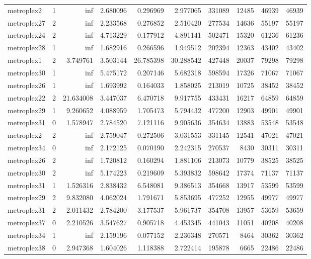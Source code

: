 \begin{longtable}{|l|r|r|r|r|r|r|r|r|r|}
metroplex2 & 1 & inf & 2.680096 & 0.296969 & 2.977065 & 331089 & 12485 & 46939 & 46939 \\
metroplex27 & 2 & inf & 2.233568 & 0.276852 & 2.510420 & 277534 & 14636 & 55197 & 55197 \\
metroplex24 & 2 & inf & 4.713229 & 0.177912 & 4.891141 & 502471 & 15320 & 61236 & 61236 \\
metroplex28 & 1 & inf & 1.682916 & 0.266596 & 1.949512 & 202394 & 12363 & 43402 & 43402 \\
metroplex1 & 2 & 3.749761 & 3.503144 & 26.785398 & 30.288542 & 427448 & 20037 & 79298 & 79298 \\
metroplex30 & 1 & inf & 5.475172 & 0.207146 & 5.682318 & 598594 & 17326 & 71067 & 71067 \\
metroplex26 & 1 & inf & 1.693992 & 0.164033 & 1.858025 & 213019 & 10725 & 38452 & 38452 \\
metroplex22 & 2 & 21.634008 & 3.447037 & 6.470718 & 9.917755 & 433431 & 16217 & 64859 & 64859 \\
metroplex29 & 1 & 9.260652 & 4.088959 & 1.705473 & 5.794432 & 477200 & 12903 & 49901 & 49901 \\
metroplex31 & 0 & 1.578947 & 2.784520 & 7.121116 & 9.905636 & 354634 & 13883 & 53548 & 53548 \\
metroplex2 & 2 & inf & 2.759047 & 0.272506 & 3.031553 & 331145 & 12541 & 47021 & 47021 \\
metroplex34 & 0 & inf & 2.172125 & 0.070190 & 2.242315 & 270537 & 8430 & 30311 & 30311 \\
metroplex26 & 2 & inf & 1.720812 & 0.160294 & 1.881106 & 213073 & 10779 & 38525 & 38525 \\
metroplex30 & 2 & inf & 5.174223 & 0.219609 & 5.393832 & 598642 & 17374 & 71137 & 71137 \\
metroplex31 & 1 & 1.526316 & 2.838432 & 6.548081 & 9.386513 & 354668 & 13917 & 53599 & 53599 \\
metroplex29 & 2 & 9.832080 & 4.062024 & 1.791671 & 5.853695 & 477252 & 12955 & 49977 & 49977 \\
metroplex31 & 2 & 2.011432 & 2.784200 & 3.177537 & 5.961737 & 354708 & 13957 & 53659 & 53659 \\
metroplex37 & 0 & 2.210526 & 3.547627 & 0.905718 & 4.453345 & 441043 & 11051 & 40208 & 40208 \\
metroplex34 & 1 & inf & 2.159196 & 0.077152 & 2.236348 & 270571 & 8464 & 30362 & 30362 \\
metroplex38 & 0 & 2.947368 & 1.604026 & 1.118388 & 2.722414 & 195878 & 6665 & 22486 & 22486 \\

\end{longtable}
